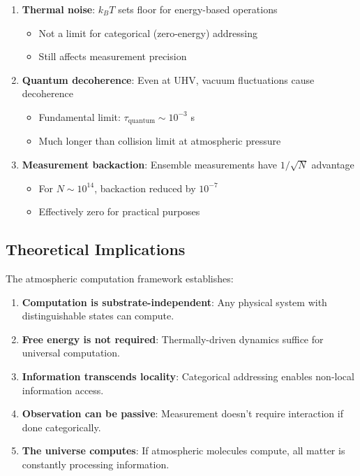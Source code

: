 \begin{enumerate}
\item \textbf{Thermal noise}: $k_B T$ sets floor for energy-based operations
\begin{itemize}
\item Not a limit for categorical (zero-energy) addressing
\item Still affects measurement precision
\end{itemize}

\item \textbf{Quantum decoherence}: Even at UHV, vacuum fluctuations cause decoherence
\begin{itemize}
\item Fundamental limit: $\tau_{\text{quantum}} \sim 10^{-3}$ s
\item Much longer than collision limit at atmospheric pressure
\end{itemize}

\item \textbf{Measurement backaction}: Ensemble measurements have $1/\sqrt{N}$ advantage
\begin{itemize}
\item For $N \sim 10^{14}$, backaction reduced by $10^{-7}$
\item Effectively zero for practical purposes
\end{itemize}
\end{enumerate}

\subsection{Theoretical Implications}

The atmospheric computation framework establishes:

\begin{enumerate}
\item \textbf{Computation is substrate-independent}: Any physical system with distinguishable states can compute.

\item \textbf{Free energy is not required}: Thermally-driven dynamics suffice for universal computation.

\item \textbf{Information transcends locality}: Categorical addressing enables non-local information access.

\item \textbf{Observation can be passive}: Measurement doesn't require interaction if done categorically.

\item \textbf{The universe computes}: If atmospheric molecules compute, all matter is constantly processing information.
\end{enumerate}

